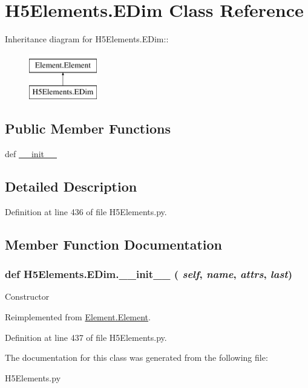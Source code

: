 \hypertarget{classH5Elements_1_1EDim}{
\section{H5Elements.EDim Class Reference}
\label{classH5Elements_1_1EDim}
}
Inheritance diagram for H5Elements.EDim::\begin{figure}[H]
\begin{center}
\leavevmode
\includegraphics[height=2cm]{classH5Elements_1_1EDim}
\end{center}
\end{figure}
\subsection*{Public Member Functions}
\begin{DoxyCompactItemize}
\item 
def \hyperlink{classH5Elements_1_1EDim_ad40b269d818a529b5fbd09cab4d29d12}{\_\-\_\-init\_\-\_\-}
\end{DoxyCompactItemize}


\subsection{Detailed Description}


Definition at line 436 of file H5Elements.py.

\subsection{Member Function Documentation}
\hypertarget{classH5Elements_1_1EDim_ad40b269d818a529b5fbd09cab4d29d12}{
\subsubsection[{\_\-\_\-init\_\-\_\-}]{\setlength{\rightskip}{0pt plus 5cm}def H5Elements.EDim.\_\-\_\-init\_\-\_\- ( {\em self}, \/   {\em name}, \/   {\em attrs}, \/   {\em last})}}
\label{classH5Elements_1_1EDim_ad40b269d818a529b5fbd09cab4d29d12}
\begin{DoxyVerb}Constructor \end{DoxyVerb}
 

Reimplemented from \hyperlink{classElement_1_1Element_a359371465b7c4d21611adec7e86c3b33}{Element.Element}.

Definition at line 437 of file H5Elements.py.

The documentation for this class was generated from the following file:\begin{DoxyCompactItemize}
\item 
H5Elements.py\end{DoxyCompactItemize}
